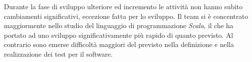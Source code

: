 \documentclass[a4paper]{article}
\begin{document}
				Durante la fase di sviluppo ulteriore ed incremento le attività non hanno subito cambiamenti significativi, 
				eccezione fatta per lo sviluppo. Il team si è concentrato maggiormente nello studio del linguaggio di 
				programmazione \emph{Scala}, il che ha portato ad uno sviluppo significativamente più rapido di quanto previsto.
				Al contrario sono emerse difficoltà maggiori del previsto nella definizione e nella realizzazione dei test per il
				software.
					
					
				
\end{document}
